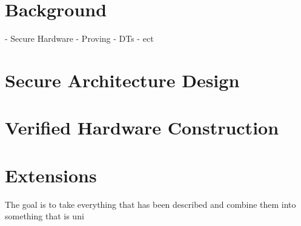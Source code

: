 \documentclass[12pt, titlepage]{article}
\begin{document}
\section{Background}
- Secure Hardware
- Proving
- DTs
- ect

\section{Secure Architecture Design}

\section{Verified Hardware Construction}

\section{Extensions}

The goal is to take everything that has been described and combine them into something that is uni



\end{document}
